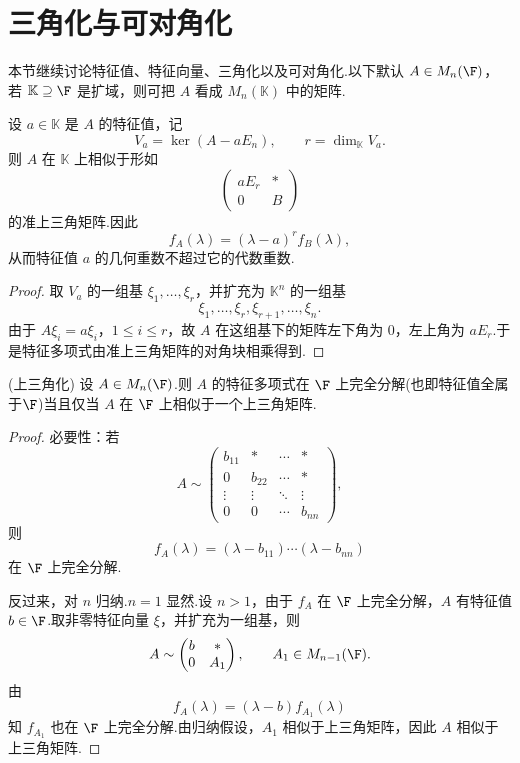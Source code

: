 \section{三角化与可对角化}

本节继续讨论特征值、特征向量、三角化以及可对角化.以下默认 $A\in M_n(\F)$，若 $\mathbb K\supseteq\F$ 是扩域，则可把 $A$ 看成 $M_n(\mathbb K)$ 中的矩阵.

\begin{lemma}
	设 $a\in\mathbb K$ 是 $A$ 的特征值，记
	\[
	V_a=\ker(A-aE_n),\qquad r=\dim_{\mathbb K}V_a.
	\]
	则 $A$ 在 $\mathbb K$ 上相似于形如
	\[
	\begin{pmatrix}
		aE_r& *\\
		0&B
	\end{pmatrix}
	\]
	的准上三角矩阵.因此
	\[
	f_A(\lambda)=(\lambda-a)^r f_B(\lambda),
	\]
	从而特征值 $a$ 的几何重数不超过它的代数重数.
\end{lemma}

\begin{proof}
	取 $V_a$ 的一组基 $\xi_1,\ldots,\xi_r$，并扩充为 $\mathbb K^n$ 的一组基
	\[
	\xi_1,\ldots,\xi_r,\xi_{r+1},\ldots,\xi_n.
	\]
	由于 $A\xi_i=a\xi_i$，$1\leq i\leq r$，故 $A$ 在这组基下的矩阵左下角为 $0$，左上角为 $aE_r$.于是特征多项式由准上三角矩阵的对角块相乘得到.
\end{proof}

\begin{proposition}
	(上三角化)
	设 $A\in M_n(\F)$.则 $A$ 的特征多项式在 $\F$ 上完全分解(也即特征值全属于$\F$)当且仅当 $A$ 在 $\F$ 上相似于一个上三角矩阵.
\end{proposition}

\begin{proof}
	必要性：若
	\[
	A\sim
	\begin{pmatrix}
		b_{11}&*&\cdots&*\\
		0&b_{22}&\cdots&*\\
		\vdots&\vdots&\ddots&\vdots\\
		0&0&\cdots&b_{nn}
	\end{pmatrix},
	\]
	则
	\[
	f_A(\lambda)=(\lambda-b_{11})\cdots(\lambda-b_{nn})
	\]
	在 $\F$ 上完全分解.
	
	反过来，对 $n$ 归纳.$n=1$ 显然.设 $n>1$，由于 $f_A$ 在 $\F$ 上完全分解，$A$ 有特征值 $b\in\F$.取非零特征向量 $\xi$，并扩充为一组基，则
	\[
	A\sim
	\begin{pmatrix}
		b&*\\
		0&A_1
	\end{pmatrix},
	\qquad A_1\in M_{n-1}(\F).
	\]
	由
	\[
	f_A(\lambda)=(\lambda-b)f_{A_1}(\lambda)
	\]
	知 $f_{A_1}$ 也在 $\F$ 上完全分解.由归纳假设，$A_1$ 相似于上三角矩阵，因此 $A$ 相似于上三角矩阵.
\end{proof}

